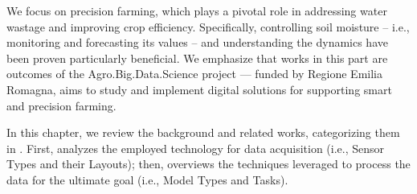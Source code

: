 
We focus on precision farming, which plays a pivotal role in addressing water
wastage and improving crop efficiency.
Specifically, controlling soil moisture -- i.e., monitoring and forecasting its values -- and understanding the dynamics have been proven particularly beneficial.
We emphasize that works in this part are outcomes of the Agro.Big.Data.Science project \cite{ABDS}--- funded by Regione Emilia Romagna, aims to study and implement digital solutions for supporting smart and precision farming.

In this chapter, we review the background and related works, categorizing them in .
First,  analyzes the employed technology for data acquisition (i.e., Sensor Types and their Layouts); then,  overviews the techniques leveraged to process the data for the ultimate goal (i.e., Model Types and Tasks).


